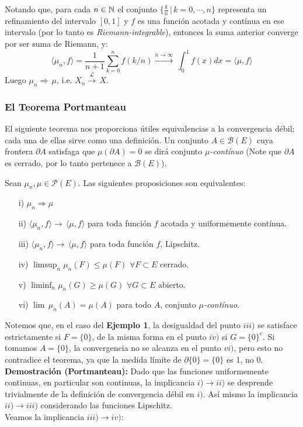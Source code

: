     Notando que, para cada $n\in\mathbb N$ el conjunto $\{\frac{k}{n}\,|\,k=0,\cdots,n\}$ representa un refinamiento del intervalo $[0,1]$ y $f$ es una función acotada y contínua en ese intervalo (por lo tanto es \textit{Riemann-integrable}), entonces la suma anterior converge por ser suma de Riemann, y:
    \[\langle \mu_n ,f\rangle = \frac{1}{n+1}\sum_{k=0}^{n}f(k/n) \xrightarrow{n\rightarrow\infty}\, \int_{0}^{1}f(x)dx = \langle \mu,f\rangle\]
    Luego $\mu_n \Rightarrow\,\mu$, i.e. $X_n \xrightarrow{\mathcal{L}}\,X$.


\subsubsection{El Teorema Portmanteau}
\hspace{3.5mm}El siguiente teorema nos proporciona útiles equivalencias a la convergencia débil; cada una de ellas sirve como una definición. Un conjunto $A \in \mathcal{B}(E)$ cuya frontera $\partial A$ satisfaga que $\mu(\partial A) = 0$ se dirá conjunto \textit{$\mu$-contínuo} (Note que $\partial A$ es cerrado, por lo tanto pertenece a $\mathcal{B}(E)$).
\begin{teorema}[Portmanteau] Sean $\mu_n,\mu \in \mathcal{P}(E)$. Las siguientes proposiciones son equivalentes:
\begin{itemize}
    \item[i)] $\mu_n \Rightarrow \mu$
    \item[ii)] $\langle \mu_n,f\rangle \rightarrow\, \langle \mu, f\rangle$ para toda función $f$ acotada y uniformemente contínua.
    \item[iii)] $\langle \mu_n , f \rangle \rightarrow\, \langle \mu, f\rangle$ para toda función $f$, Lipschitz.
    \item[iv)] $\limsup_n \mu_n(F) \leq \mu(F)$   $\forall F \subset E$ cerrado.
    \item[v)] $\liminf_n \mu_n(G) \geq \mu(G)$     $\forall G\subset E$ abierto.
    \item[vi)] $\lim\, \mu_n(A) = \mu(A)$ para todo $A$, conjunto \textit{$\mu$-contínuo}. 
\end{itemize}
\end{teorema}

Notemos que, en el caso del \textbf{Ejemplo 1}, la desigualdad del punto $iii)$ se satisface estrictamente si $F=\{0\}$, de la misma forma en el punto $iv)$ si $G=\{0\}^{c}$. Si tomamos $A=\{0\}$, la convergencia no se alcanza en el punto $vi)$, pero esto no contradice el teorema, ya que la medida límite de $\partial \{0\} = \{0\}$ es 1, no 0. 
\\ \newline
\textbf{Demostración (Portmanteau):} Dado que las funciones uniformemente continuas, en particular son continuas, la implicancia $i)\rightarrow ii)$ se desprende trivialmente de la definición de convergencia débil en $i)$. Así mismo la implicancia $ii) \rightarrow iii)$ considerando las funciones Lipschitz.\\
Veamos la implicancia $iii) \rightarrow iv)$: \\ 

